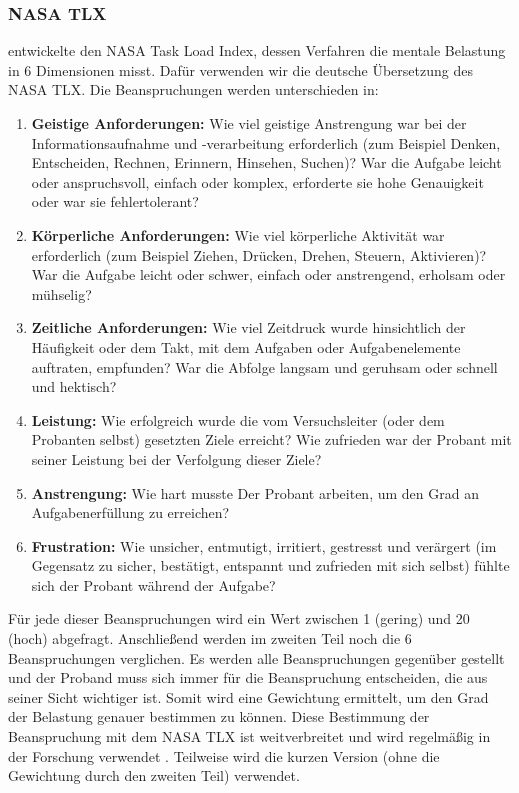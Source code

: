 \subsubsection{NASA TLX}
\citet{hart1988development} entwickelte den NASA Task Load Index, dessen Verfahren die mentale Belastung in 6 Dimensionen misst. 
Dafür verwenden wir die deutsche Übersetzung des NASA TLX. 
Die Beanspruchungen werden unterschieden in: 
\begin{enumerate}
	\item \textbf{Geistige Anforderungen:} Wie viel geistige Anstrengung war bei der Informationsaufnahme und -verarbeitung erforderlich (zum Beispiel Denken, Entscheiden, Rechnen, Erinnern, Hinsehen, Suchen)? 
War die Aufgabe leicht oder anspruchsvoll, einfach oder komplex, erforderte sie hohe Genauigkeit oder war sie fehlertolerant?
	\item \textbf{Körperliche Anforderungen:} Wie viel körperliche Aktivität war erforderlich (zum Beispiel Ziehen, Drücken, Drehen, Steuern, Aktivieren)? 
	War die Aufgabe leicht oder schwer, einfach oder anstrengend, erholsam oder mühselig?
	\item \textbf{Zeitliche Anforderungen:} Wie viel Zeitdruck wurde hinsichtlich der Häufigkeit oder dem Takt, mit dem Aufgaben oder Aufgabenelemente auftraten, empfunden? War die Abfolge langsam und geruhsam oder schnell und hektisch?
	\item \textbf{Leistung:} Wie erfolgreich wurde die vom Versuchsleiter (oder dem Probanten selbst) gesetzten Ziele erreicht? Wie zufrieden war der Probant mit seiner Leistung bei der Verfolgung dieser Ziele?
	\item \textbf{Anstrengung:} Wie hart musste Der Probant arbeiten, um den Grad an Aufgabenerfüllung zu erreichen?
	\item \textbf{Frustration:} Wie unsicher, entmutigt, irritiert, gestresst und verärgert (im Gegensatz zu sicher, bestätigt, entspannt und zufrieden mit sich selbst) fühlte sich der Probant während der Aufgabe?
\end{enumerate}
Für jede dieser Beanspruchungen wird ein Wert zwischen 1 (gering) und 20 (hoch) abgefragt. 
Anschließend werden im zweiten Teil noch die 6 Beanspruchungen verglichen. 
Es werden alle Beanspruchungen gegenüber gestellt und der Proband muss sich immer für die Beanspruchung entscheiden, die aus seiner Sicht wichtiger ist. 
Somit wird eine Gewichtung ermittelt, um den Grad der Belastung genauer bestimmen zu können. 
Diese Bestimmung der Beanspruchung mit dem NASA TLX ist weitverbreitet und wird regelmäßig in der Forschung verwendet \citep{hart2006nasa}. 
Teilweise wird die kurzen Version (ohne die Gewichtung durch den zweiten Teil) verwendet. 

